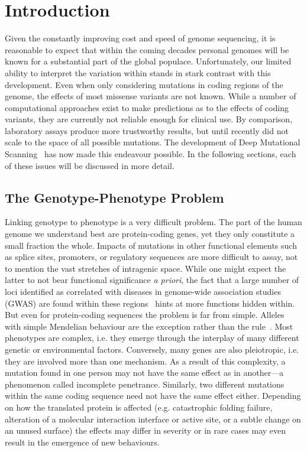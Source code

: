 
\chapter{Introduction}

Given the constantly improving cost and speed of genome sequencing, it is reasonable to expect that within the coming decades personal genomes will be known for a substantial part of the global populace. Unfortunately, our limited ability to interpret the variation within stands in stark contrast with this development. Even when only considering mutations in coding regions of the genome, the effects of most missense variants are not known. While a number of computational approaches exist to make predictions as to the effects of coding variants, they are currently not reliable enough for clinical use. By comparison, laboratory assays produce more trustworthy results, but until recently did not scale to the space of all possible mutations. The development of Deep Mutational Scanning~\cite{fowler_high-resolution_2010} has now made this endeavour possible. In the following sections, each of these issues will be discussed in more detail.

\section{The Genotype-Phenotype Problem}
\label{introGenoPheno}

Linking genotype to phenotype is a very difficult problem. The part of the human genome we understand best are protein-coding genes, yet they only constitute a small fraction the whole. Impacts of mutations in other functional elements such as splice sites, promoters, or regulatory sequences are more difficult to assay, not to mention the vast stretches of intragenic space. While one might expect the latter to not bear functional significance \textit{a priori}, the fact that a large number of loci identified as correlated with diseases in genome-wide association studies (GWAS) are found within these regions~\cite{edwards_beyond_2013} hints at more functions hidden within. 
But even for protein-coding sequences the problem is far from simple. Alleles with simple Mendelian behaviour are the exception rather than the rule~. Most phenotypes are complex, i.e. they emerge through the interplay of many different genetic or environmental factors. Conversely, many genes are also pleiotropic, i.e. they are involved more than one mechanism. As a result of this complexity, a mutation found in one person may not have the same effect as in another---a phenomenon called incomplete penetrance. Similarly, two different mutations within the same coding sequence need not have the same effect either. Depending on how the translated protein is affected (e.g. catastrophic folding failure, alteration of a molecular interaction interface or active site, or a subtle change on an unused surface) the effects may differ in severity or in rare cases may even result in the emergence of new behaviours.

